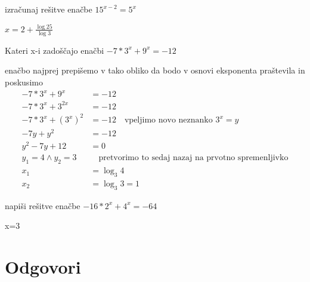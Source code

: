 \begin{vaja}
	izračunaj rešitve enačbe \( 15^{x-2}=5^x\)
  \begin{odgovor}
   	$x=2+\frac{\log25}{\log3}$
  \end{odgovor}
\end{vaja}

\begin{vaja}
	Kateri x-i zadoščajo enačbi \(-7*3^x+9^x=-12\)
  \begin{odgovor}
   	enačbo najprej prepišemo v tako obliko  da bodo v osnovi eksponenta praštevila in poskusimo
	\begin{align*}
	-7*3^x+9^x&=-12\\
	-7*3^x+3^{2x}&=-12\\
	-7*3^x+(3^x)^2&=-12\quad \text{vpeljimo novo neznanko } 3^x=y\\
	-7y+y^2&=-12\\
	y^2-7y+12&=0\\
	y_{1}=4 \wedge y_{2}=3 & \quad \text{pretvorimo to sedaj nazaj na prvotno spremenljivko}\\
	x_{1}&=\log_{3}{4}\\
	x_{2}&=\log_{3}{3}=1
	\end{align*}
  \end{odgovor}
\end{vaja}

\begin{vaja}
	napiši rešitve enačbe $-16*2^x+4^x=-64$
  \begin{odgovor}
   	x=3
  \end{odgovor}
\end{vaja}

\begin{vaja}
  \begin{odgovor}
   
  \end{odgovor}
\end{vaja}




\section{Odgovori}
\label{sec:explog-odgovori}




